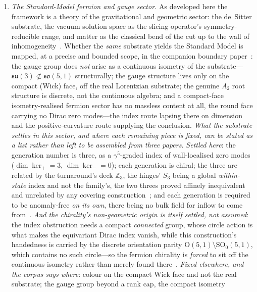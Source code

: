\documentclass[11pt,a4paper]{article}
\theoremstyle{plain}
\theoremstyle{definition}
\theoremstyle{remark}
\begin{document}
\begin{enumerate}
\item\label{frontier:sm} \emph{The Standard-Model fermion and gauge sector.} As developed here the framework is a theory of the gravitational and geometric sector: the de~Sitter substrate, the vacuum solution space as the slicing operator's symmetry-reducible range, and matter as the classical bend of the cut up to the wall of inhomogeneity~\cite{JanzenOperator,JanzenRange}. Whether the \emph{same} substrate yields the Standard Model is mapped, at a precise and bounded scope, in the companion boundary paper~\cite{JanzenBoundary}: the gauge group does \emph{not} arise as a continuous isometry of the substrate---$\mathfrak{su}(3)\not\subset\mathfrak{so}(5,1)$ structurally; the gauge structure lives only on the compact (Wick) face, off the real Lorentzian substrate; the genuine $A_2$ root structure is discrete, not the continuous algebra; and a compact-face isometry-realised fermion sector has no massless content at all, the round face carrying no Dirac zero modes---the index route lapsing there on dimension and the positive-curvature route supplying the conclusion. \emph{What the substrate settles in this sector, and where each remaining piece is fixed, can be
stated as a list rather than left to be assembled from three papers.}  \emph{Settled here}: the
generation number is three, as a $\gamma^{5}$-graded index of wall-localised zero modes
($\dim\ker_{+}=3$, $\dim\ker_{-}=0$); each generation is chiral; the three are related by the turnaround's deck
$\mathbb{Z}_{3}$, the hinges' $S_{3}$ being a global \emph{within-state} index and not the family's, the two threes proved affinely inequivalent and unrelated by any covering
construction~\cite{JanzenMatter}; and each generation is required to be anomaly-free \emph{on its own}, there
being no bulk field for inflow to come from~\cite{JanzenMatter}.  \emph{And the chirality's
non-geometric origin is itself settled, not assumed}: the index obstruction needs a compact
\emph{connected} group, whose circle action is what makes the equivariant Dirac index vanish, while
this construction's handedness is carried by the discrete orientation parity
$\mathrm{O}(5,1)\setminus\mathrm{SO}_{0}(5,1)$, which contains no such circle---so the fermion
chirality is \emph{forced} to sit off the continuous isometry rather than merely found
there~\cite{JanzenBoundary}.  \emph{Fixed elsewhere, and the corpus says where}: colour on the
compact Wick face and not the real substrate; the gauge group beyond a rank cap, the compact isometry

\end{enumerate}
\end{document}
